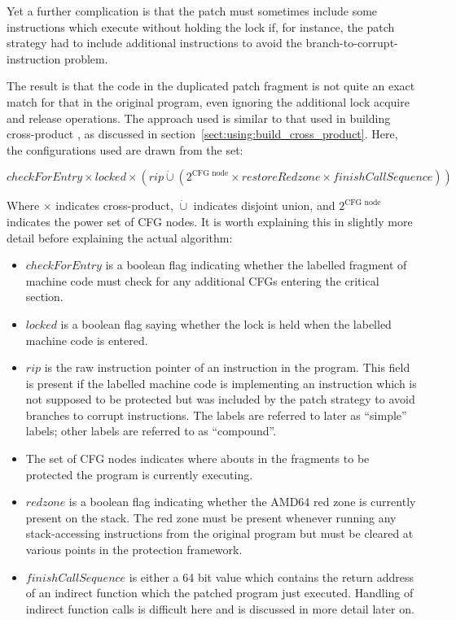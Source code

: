 Yet a further complication is that the patch must sometimes include
some instructions which execute without holding the lock if, for
instance, the patch strategy had to include additional instructions to
avoid the branch-to-corrupt-instruction problem.

The result is that the code in the duplicated patch fragment is not
quite an exact match for that in the original program, even ignoring
the additional lock acquire and release operations.  The approach used
is similar to that used in building cross-product {\StateMachines}, as
discussed in section~\ref{sect:using:build_cross_product}.  Here, the
configurations used are drawn from the set:

\begin{displaymath}
  checkForEntry \times locked \times (rip \dot{\cup} (2^{\textrm{CFG node}} \times restoreRedzone \times finishCallSequence))
\end{displaymath}

Where $\times$ indicates cross-product, $\dot{\cup}$ indicates disjoint
union, and $2^{\textrm{CFG node}}$ indicates the power set of CFG
nodes.  It is worth explaining this in slightly more detail before
explaining the actual algorithm:

\begin{itemize}
\item $checkForEntry$ is a boolean flag indicating whether the
  labelled fragment of machine code must check for any additional
  CFGs entering the critical section.
\item $locked$ is a boolean flag saying whether the lock is
  held when the labelled machine code is entered.
\item $rip$ is the raw instruction pointer of an instruction in the
  program.  This field is present if the labelled machine code is
  implementing an instruction which is not supposed to be protected
  but was included by the patch strategy to avoid branches to corrupt
  instructions.  The labels are referred to later as ``simple''
  labels; other labels are referred to as ``compound''.
\item The set of CFG nodes indicates where abouts in the fragments
  to be protected the program is currently executing.
\item $redzone$ is a boolean flag indicating whether the AMD64
  red zone is currently present on the stack.  The red zone must be
  present whenever running any stack-accessing instructions from the
  original program but must be cleared at various points in the
  protection framework.
\item $finishCallSequence$ is either a 64 bit value which contains the
  return address of an indirect function which the patched program
  just executed.  Handling of indirect function calls is difficult
  here and is discussed in more detail later on.
\end{itemize}


